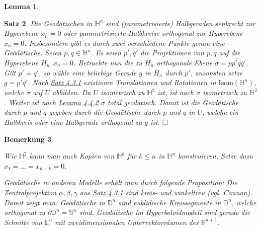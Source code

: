 \documentclass[11pt]{book}
\numberwithin{dummy}{section}
\newtheorem{theorem}{Satz}[section]
\newtheorem{lemma}[theorem]{Lemma}
\newtheorem{remark}[theorem]{Bemerkung}
\theoremstyle{nonumberbreak}
\newenvironment{pr}[1][]{\ifthenelse{\equal{#1}{}}{\proof}{\proof[#1]}\rm}{\endproof}
\newcommand{\Loid}{\mathbb{L}}
\newcommand{\R}{\mathbb{R}}
\newcommand{\Sph}{\mathbb{S}}
\newcommand{\He}{\mathbb{H}}
\newcommand{\D}{\mathbb{D}}
\begin{document}
\begin{spacing}{1.4}
\begin{lemma}
\end{lemma}


\begin{theorem}
Die Geodätischen in $\He^n$ sind (parametrisierte) Halbgeraden senkrecht zur Hyperebene $x_n=0$ oder parametrisierte Halbkreise orthogonal zur Hyperebene $x_n=0$. Insbesondere gibt es durch zwei verschiedene Punkte genau eine Geodätische.
\begin{pr}
Seien $p,q \in \He^n$. Es seien $p', q'$ die Projektionen von $p,q$ auf die Hyperebene $H_n: x_n=0$. Betrachte nun die zu $H_n$ orthogonale Ebene $\sigma= \overline{pp'qq'}$. Gilt $p'=q'$, so wähle eine beliebige Gerade $g$ in $H_n$ durch $p'$, ansonsten setze $g= \overline{p'q'}$. Nach \hyperlink{satzvierdreieins}{Satz 4.3.1} existieren Translationen und Rotationen in $\mathrm{Isom}(\He^n)$, welche $\sigma$ auf $U$ abbilden. Da $U$ isometrisch zu $\He^2$ ist, ist auch $\sigma$ isometrisch zu $\He^2$. Weiter ist nach \hyperlink{lemmaviervierzwei}{Lemma 4.4.2} $\sigma$ total geodätisch. Damit ist die Geodätische durch $p$ und $q$ gegeben durch die Geodätische durch $p$ und $q$ in $U$, welche ein Halbkreis oder eine Halbgerade orthogonal zu $g$ ist. $\hfill \Box$

\end{pr}

\end{theorem}


\begin{remark}
\begin{compactenum}
\item Wie $\He^2$ kann man auch Kopien von $\He^k$ für $k\leqslant n$ in $\He^n$ konstruieren. Setze dazu $x_1= \ldots = x_{n-k} = 0$. 
\item Geodätische in anderen Modelle erhält man durch folgende Proposition: Die Zentralprojektion $\alpha, \beta,\gamma$ aus \hyperlink{satzvierdreieins}{Satz 4.3.1} sind kreis- und winkeltreu (vgl. Cannon). Damit zeigt man: Geodätische in $\D^n$ sind euklidische Kreissegmente in $\D^n$, welche orthogonal zu $\partial \D^n = \Sph^n$ sind. Geodätische im Hyperboloidmodell sind gerade die Schnitte von $\Loid^n$ mit zweidimensionalen Untervektorräumen des $\R^{n+1}$. 
\end{compactenum}

\end{remark}



















\end{spacing}
\end{document}
